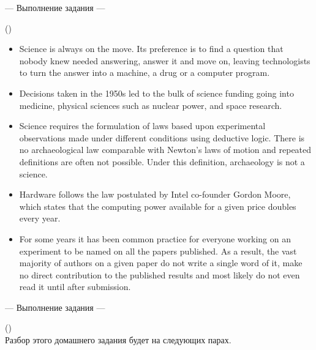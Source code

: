 \documentclass[main.tex]{subfiles}
\begin{document}
\newpage
{}

\hypertarget{ltask:2024-04-10-2}{--- Выполнение задания ---} (\hyperref[task:2024-04-10-2]{\color{blue}{перейти к тексту задания}})
\\

\vspace{5pt}
\begin{itemize}[nosep, leftmargin=*]
	\itemsep10pt
	\item Science is always on the move. Its preference is to find a question that nobody knew needed answering, answer it and move on, leaving technologists to turn the answer into a machine, a drug or a computer program.
	\item Decisions taken in the 1950s led to the bulk of science funding going into medicine, physical sciences such as nuclear power, and space research.
	\item Science requires the formulation of laws based upon experimental observations made under different conditions using deductive logic. There is no archaeological law comparable with Newton's laws of motion and repeated definitions are often not possible. Under this definition, archaeology is not a science.
	\item Hardware follows the law postulated by Intel co-founder Gordon Moore, which states that the computing power available for a given price doubles every year.
	\item For some years it has been common practice for everyone working on an experiment to be named on all the papers published. As a result, the vast majority of authors on a given paper do not write a single word of it, make no direct contribution to the published results and most likely do not even read it until after submission.
\end{itemize}

\newpage
{}

\hypertarget{ltask:2024-04-10-3}{--- Выполнение задания ---} (\hyperref[task:2024-04-10-3]{\color{blue}{перейти к тексту задания}})
\\

Разбор этого домашнего задания будет на следующих парах.
\end{document}

